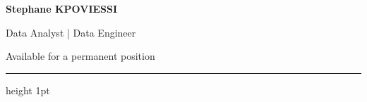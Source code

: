 \documentclass[10pt,a4paper]{article}
\begin{document}
\fontsize{10pt}{12.3pt}\selectfont
\sloppy

\begin{minipage}[t]{0.52\textwidth}
{\LARGE\bfseries\color{accentdark} Stephane KPOVIESSI}\par
\vspace{1pt}
{\large\color{accent}Data Analyst | Data Engineer}\par
\vspace{1pt}
{\color{muted}Available for a permanent position}
\end{minipage}
\hfill
\begin{minipage}[t]{0.42\textwidth}
\raggedleft
\vspace{2pt}
\par
\vspace{3pt}
\end{minipage}

\vspace{6pt}
{\color{rule}\hrule height 1pt}
\vspace{7pt}
\end{document}
